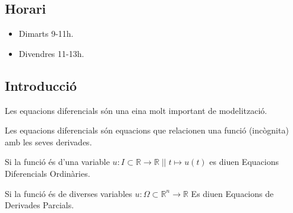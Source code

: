 \documentclass[../main.tex]{subfiles}
\begin{document}
\subsection*{Horari}
\begin{itemize}
    \item Dimarts 9-11h.
    \item Divendres 11-13h.
\end{itemize}
\setcounter{subsection}{-1}
\subsection{Introducció}
Les equacions diferencials són una eina molt important de modelització.
\begin{definicio}
    Les equacions diferencials són equacions que relacionen una funció (incògnita) amb les seves
    derivades.
\end{definicio}
\begin{definicio}
    Si la funció és d'una variable $u: I \subset \mathbb{R} \rightarrow \mathbb{R}\;||\;t \mapsto u(t)$
    es diuen Equacions Diferencials Ordinàries.
\end{definicio}
\begin{definicio}
    Si la funció és de diverses variables $u : \Omega \subset \mathbb{R}^n \to \mathbb{R}$ Es diuen
    Equacions de Derivades Parcials.
\end{definicio}
\end{document}
